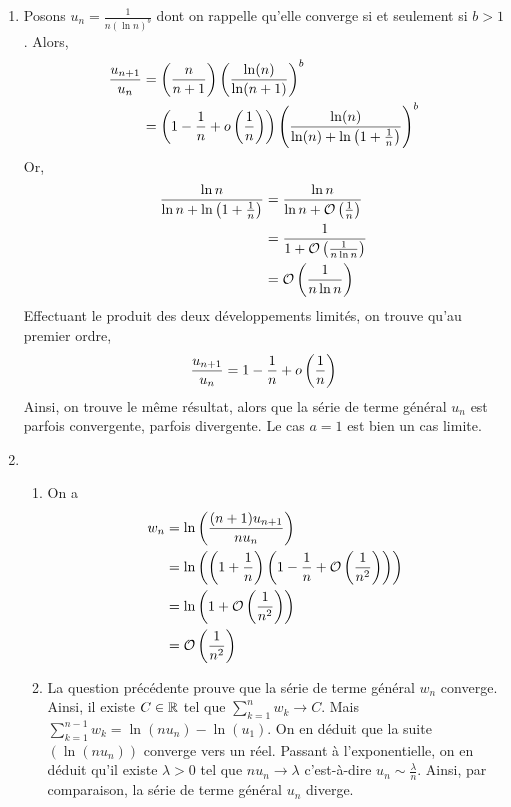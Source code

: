 \begin{enumerate}
    \item Posons $u_n=\frac{1}{n(\ln n)^b}$ dont on rappelle qu'elle converge si et seulement si $b>1$.
Alors, 
        \[
            \begin{aligned}
                \frac{u_{n+1}}{u_n}&=\left(\frac{n}{n+1}\right)\left(\frac{\ln (n)}{\ln(n+1)}\right)^b\\
                &=\left(1-\frac{1}{n}+o\left(\frac{1}{n}\right)\right)\left(\frac{\ln (n)}{\ln(n)+\ln\left(1+\frac{1}{n}\right)}\right)^b
            \end{aligned}
        \]
        Or, 
        \[
            \begin{aligned}
                \frac{\ln n}{\ln n+\ln\left(1+\frac{1}{n}\right)}&=\frac{\ln n}{\ln n+\mathcal{O}\left(\frac{1}{n}\right)}\\
                &=\frac{1}{1+\mathcal{O}\left(\frac{1}{n\ln n}\right)}\\
                &=\mathcal{O}\left(\frac1{n\ln n}\right)
            \end{aligned}
        \]
        Effectuant le produit des deux développements limités, on trouve qu'au premier ordre,
        \[
            \frac{u_{n+1}}{u_n}=1-\frac{1}{n}+o\left(\frac{1}{n}\right)
        \]
        Ainsi, on trouve le même résultat, alors que la série de terme général $u_n$ est parfois convergente, parfois divergente. Le cas $a=1$ est bien un cas limite. 
    \item
        \begin{enumerate}
            \item  On a 
                \[
                    \begin{aligned}
                        w_n&=\ln\left(\frac{(n+1)u_{n+1}}{nu_n}\right)\\
                        &=\ln\left(\left(1+\frac{1}{n}\right)\left(1-\frac{1}{n}+\mathcal{O}\left(\frac{1}{n^2}\right)\right)\right)\\
                        &=\ln\left(1+\mathcal{O}\left(\frac{1}{n^2}\right)\right)\\
                        &=\mathcal{O}\left(\frac{1}{n^2}\right)
                    \end{aligned}
                \]
            \item La question précédente prouve que la série de terme général $w_n$ converge. Ainsi, il existe $C\in\mathbb{R}$ tel que $\sum\limits_{k=1}^nw_k\to C$. Mais $\sum\limits_{k=1}^{n-1} w_k=\ln(nu_n)-\ln(u_1)$. On en déduit que la suite $(\ln(nu_n))$ converge vers un réel. Passant à l'exponentielle, on en déduit qu'il existe $\lambda>0$ tel que $nu_n\to\lambda$ c'est-à-dire $u_n\sim\frac\lambda n$. Ainsi, par comparaison, la série de terme général $u_n$ diverge.
        \end{enumerate}
\end{enumerate}

